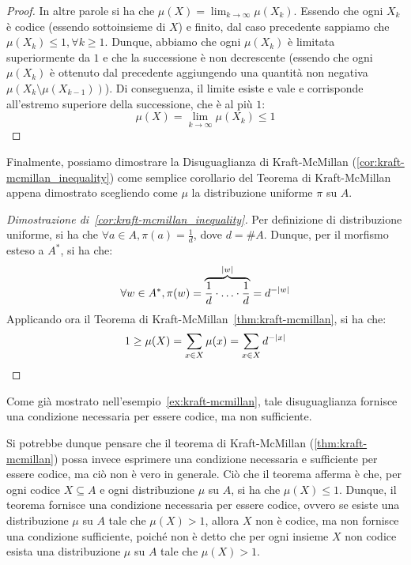 \begin{proof}
  In altre parole si ha che \(\mu(X) = \lim_{k \to \infty} \mu(X_k)\). Essendo che ogni \(X_k\) è codice (essendo sottoinsieme di \(X\)) e finito, dal caso precedente sappiamo che \(\mu(X_k) \leq 1, \forall k \geq 1\).
  Dunque, abbiamo che ogni \(\mu(X_k)\) è limitata superiormente da \(1\) e che la successione è non decrescente (essendo che ogni \(\mu(X_k)\) è ottenuto dal precedente aggiungendo una quantità non negativa \(\mu(X_{k}\setminus\mu(X_{k-1}))\)). 
  Di conseguenza, il limite esiste e vale e corrisponde all'estremo superiore della successione, che è al più \(1\):
  \[\mu(X) = \lim_{k \to \infty} \mu(X_k) \leq 1\]
\end{proof}

Finalmente, possiamo dimostrare la Disuguaglianza di Kraft-McMillan (\ref{cor:kraft-mcmillan_inequality}) come semplice corollario del Teorema di Kraft-McMillan appena dimostrato scegliendo come \(\mu\) la distribuzione uniforme \(\pi\) su \(A\).

\begin{proof}[Dimostrazione di~\ref{cor:kraft-mcmillan_inequality}]
  Per definizione di distribuzione uniforme, si ha che \(\forall a \in A, \pi(a) = \frac{1}{d}\), dove \(d = \# A\).
  Dunque, per il morfismo esteso a \(A^*\), si ha che:
  \begin{equation*}
    \forall w \in A^*, \pi(w) = \overbrace{\frac{1}{d}\cdot\ldots\cdot\frac{1}{d}}^{\left|w\right|} = d^{-\lvert w\rvert}
  \end{equation*}
  Applicando ora il Teorema di Kraft-McMillan~\ref{thm:kraft-mcmillan}, si ha che:
  \[1 \geq\mu(X) = \sum_{x \in X} \mu(x) = \sum_{x \in X} d^{-\left|x\right|}\]
\end{proof}

Come già mostrato nell'esempio~\ref{ex:kraft-mcmillan}, tale disuguaglianza fornisce una condizione necessaria per essere codice, ma non sufficiente.

Si potrebbe dunque pensare che il teorema di Kraft-McMillan (\ref{thm:kraft-mcmillan}) possa invece esprimere una condizione necessaria e sufficiente per essere codice, ma ciò non è vero in generale.
Ciò che il teorema afferma è che, per ogni codice \(X \subseteq A\) e ogni distribuzione \(\mu\) su \(A\), si ha che \(\mu(X) \leq 1\).
Dunque, il teorema fornisce una condizione necessaria per essere codice, ovvero se esiste una distribuzione \(\mu\) su \(A\) tale che \(\mu(X) > 1\), allora \(X\) non è codice, ma non fornisce una condizione sufficiente, poiché non è detto che per ogni insieme \(X\) non codice esista una distribuzione \(\mu\) su \(A\) tale che \(\mu(X) > 1\).

